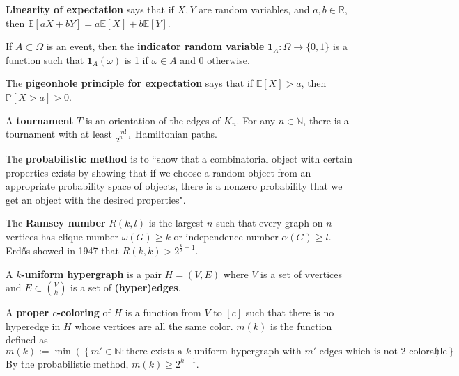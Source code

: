 \documentclass[10pt]{article}
\begin{document}
\textbf{Linearity of expectation} says that if $X,Y$ are random variables, and $a,b \in \mathbb{R}$, then $\mathbb{E}[aX+bY]=a\mathbb{E}[X]+b\mathbb{E}[Y]$.
\par
If $A \subset \Omega$ is an event, then the \textbf{indicator random variable} $\mathbf{1}_A: \Omega \rightarrow \{0,1\}$ is a function such that $\mathbf{1}_A(\omega)$ is 1 if $\omega \in A$ and $0$ otherwise.
\par
The \textbf{pigeonhole principle for expectation} says that if $\mathbb{E}[X]>a$, then $\mathbb{P}[X>a]>0$.
\par
A \textbf{tournament} $T$ is an orientation of the edges of $K_n$. For any $n \in \mathbb{N}$, there is a tournament with at least $\frac{n!}{2^{n-1}}$ Hamiltonian paths.
\par
The \textbf{probabilistic method} is to ``show that a combinatorial object with certain properties exists by showing that if we choose a random object from an appropriate probability space of objects, there is a nonzero probability that we get an object with the desired properties".
\par
The \textbf{Ramsey number} $R(k,l)$ is the largest $n$ such that every graph on $n$ vertices has clique number $\omega(G)\geq k$ or independence number $\alpha(G)\geq l$. Erdős showed in 1947 that $R(k,k) > 2^{ \frac{k}{2}-1}$.
\par
A \textbf{$k$-uniform hypergraph} is a pair $H=(V,E)$ where $V$ is a set of vvertices and $E \subset \binom{V}{k}$ is a set of \textbf{(hyper)edges}.
\par
A \textbf{proper $c$-coloring} of $H$ is a function from $V$ to $[c]$ such that there is no hyperedge in $H$ whose vertices are all the same color. $m(k)$ is the function defined as
\[ m(k) := \operatorname{min} \left( \left\{ m' \in \mathbb{N}: \text{there exists a $k$-uniform hypergraph with $m'$ edges which is not 2-colorable} \right\} \right). \]
By the probabilistic method, $m(k) \geq 2^{k-1}$.
\end{document}
